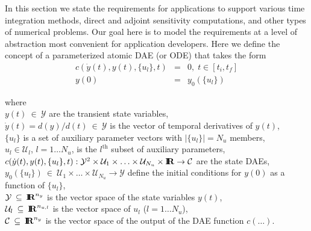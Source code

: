 \documentclass[pdf,ps2pdf,11pt]{SANDreport}
\begin{document}
In this section we state the requirements for applications to support various
time integration methods, direct and adjoint sensitivity computations, and
other types of numerical problems.  Our goal here is to model the requirements
at a level of abstraction most convenient for application developers.  Here we
define the concept of a parameterized atomic DAE (or ODE) that takes the form
%
\begin{eqnarray}
c\left( \dot{y}(t), y(t), \{u_l\}, t \right) & = & 0,
\; t \in \left[ t_i, t_f \right] \label{rythmos:eqn:atomic:c} \\
y(0) & = & y_0(\{u_l\}) \label{rythmos:eqn:atomic:c:ic}
\end{eqnarray}
\begin{tabbing}
\hspace{4ex}where\hspace{1ex}\= \\
\>	$y(t) \:\in\:\mathcal{Y}$ are the transient state variables, \\
\>	$\dot{y}(t) = d(y)/d(t)\:\in\:\mathcal{Y}$ is the vector of temporal derivatives of $y(t)$, \\
\>	$\{u_l\}$ is a set of auxiliary parameter vectors with $|\{u_l\}| = N_u$ members, \\
\>	$u_l\in\mathcal{U}_l$, $l=1 {}\ldots N_u$, is the $l^{\mbox{th}}$ subset of auxiliary parameters, \\
\>	$c(\dot{y}(t), y(t), \{u_l\}, t) :
		\mathcal{Y}^2 \times \mathcal{U}_1 \times \ldots \times \mathcal{U}_{N_u} \times \mbox{\textbf{I}}\hspace{-0.6ex}\mbox{\textbf{R}}
		\rightarrow \mathcal{C}$ are the state DAEs, \\
\>	$y_0(\{u_l\}) \:\in\:\mathcal{U}_1 \times \ldots \times \mathcal{U}_{N_u} \rightarrow \mathcal{Y}$
		define the initial conditions for $y(0)$ as a function of $\{u_l\}$, \\
\>	$\mathcal{Y} \:\subseteq\:\mbox{\textbf{I}}\hspace{-0.6ex}\mbox{\textbf{R}}^{n_y}$ is the vector space of the state variables $y(t)$, \\
\>	$\mathcal{U}_l \:\subseteq\:\mbox{\textbf{I}}\hspace{-0.6ex}\mbox{\textbf{R}}^{n_{u,l}}$ is the vector space of $u_l$ ($l = 1 {}\ldots N_u$), \\
\>	$\mathcal{C} \:\subseteq\:\mbox{\textbf{I}}\hspace{-0.6ex}\mbox{\textbf{R}}^{n_y}$ is the vector space of the output of the DAE function $c(\ldots)$.
\end{tabbing}
\end{document}
